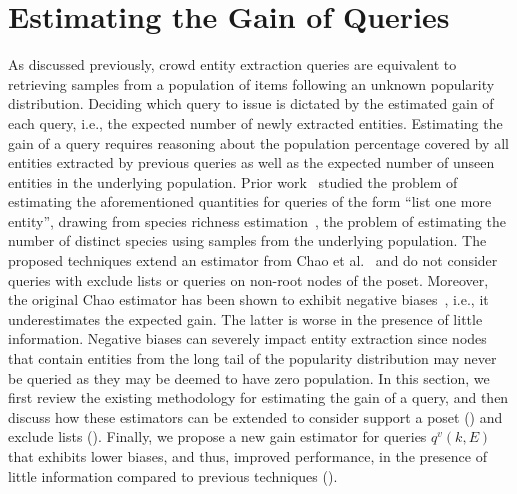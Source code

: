 
\section{Estimating the Gain of Queries}
\label{sec:gainestimators}
As discussed previously, crowd entity extraction queries are equivalent to retrieving samples from a population of items following an unknown popularity distribution. Deciding which query to issue is dictated by the estimated gain of each query, i.e., the expected number of newly extracted entities. Estimating the gain of a query requires reasoning about the population percentage covered by all entities extracted by previous queries as well as the expected number of unseen entities in the underlying population.
Prior work~\cite{trushkowsky:2013,DBLP:journals/cacm/TrushkowskyKS16} studied the problem of estimating the aforementioned quantities for queries of the form ``list one more entity'', drawing from species richness estimation~\cite{chao:1992},
the problem of estimating the number of distinct species using samples from the underlying population. The proposed techniques extend an estimator from Chao et al.~\cite{chao:1992} and do not consider queries with exclude lists or queries on non-root nodes of the poset. Moreover, the original Chao estimator has been shown to exhibit negative biases~\cite{hwang:2010, shen:2003}, i.e., it underestimates the expected gain. The latter is worse in the presence of little information. Negative biases can severely impact entity extraction since nodes that contain entities from the long tail of the popularity distribution may never be queried as they may be deemed to have zero population. In this section, we first review the existing methodology for estimating the gain of a query, and then discuss how these estimators can be extended to consider support a poset () and exclude lists (). 
Finally, we propose a new gain estimator for queries $q^v(k,E)$ that exhibits lower biases, and thus, improved performance, in the presence of little information compared to previous techniques ().


